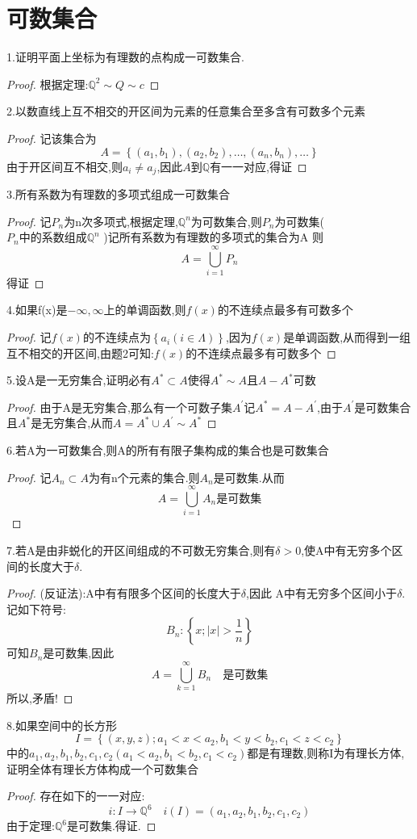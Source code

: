 \section{可数集合}
1.证明平面上坐标为有理数的点构成一可数集合.
\begin{proof}
    根据定理:\(\mathbb{Q}^2 \sim Q \sim c\)
\end{proof}
2.以数直线上互不相交的开区间为元素的任意集合至多含有可数多个元素
\begin{proof}
    记该集合为\[A=\left\{(a_1,b_1),(a_2,b_2),\dots,(a_n,b_n),\dots \right\}\]
    由于开区间互不相交,则\(a_i \neq a_j\),因此\(A\)到\(\mathbb{Q}\)有一一对应,得证
\end{proof}
3.所有系数为有理数的多项式组成一可数集合
\begin{proof}
    记\(P_n\)为n次多项式,根据定理,\(\mathbb{Q}^n\)为可数集合,则\(P_n\)为可数集(\(P_n \text{中的系数组成}\mathbb{Q}^n\) )记所有系数为有理数的多项式的集合为A
    则\[A=\bigcup\limits_{i=1}^{\infty}P_n \]得证
\end{proof}
4.如果f(x)是\(-\infty , \infty \)上的单调函数,则\(f(x)\)的不连续点最多有可数多个
\begin{proof}
    记\(f(x)\)的不连续点为\(\left\{a_i (i \in \Lambda)\right\}\),因为\(f(x)\)是单调函数,从而得到一组互不相交的开区间,由题2可知:\(f(x)\)的不连续点最多有可数多个
\end{proof}
5.设A是一无穷集合,证明必有\(A^{*} \subset A\)使得\(A^{*} \sim A\)且\(A -A^{*}\)可数
\begin{proof}
    由于A是无穷集合,那么有一个可数子集\(A^{'}\)记\(A^{*}=A - A^{'}\),由于\(A^{'}\)是可数集合且\(A^{*}\)是无穷集合,从而\(A=A^{*}\cup A^{'} \sim A^{*}\)
\end{proof}
6.若A为一可数集合,则A的所有有限子集构成的集合也是可数集合
\begin{proof}
    记\(A_n \subset A\)为有n个元素的集合.则\(A_n\)是可数集.从而\[A=\bigcup\limits_{i=1}^{\infty}A_n \text{是可数集}\]
\end{proof}
7.若A是由非蜕化的开区间组成的不可数无穷集合,则有\(\delta >0\),使A中有无穷多个区间的长度大于\(\delta\).
\begin{proof}
    (反证法):A中有有限多个区间的长度大于\(\delta\),因此 A中有无穷多个区间小于\(\delta\). 记如下符号:
    \[B_n :  \left\{x ; |x| > \frac{1}{n} \right\}\]
    可知\(B_n\)是可数集,因此\[A = \bigcup\limits_{k=1}^{\infty} B_n\quad \text{是可数集}\]
    所以,矛盾!
\end{proof}
8.如果空间中的长方形\[I = \left\{(x,y,z) ; a_1 < x<a_2 , b_1<y < b_2,c_1<z<c_2\right\}\]
中的\(a_1,a_2,b_1,b_2,c_1,c_2(a_1< a_2 , b_1 <b_2 ,c_1 <c_2)\)都是有理数,则称I为有理长方体,证明全体有理长方体构成一个可数集合
\begin{proof}
    存在如下的一一对应:\[i: I \rightarrow \mathbb{Q}^6 \quad i(I)=(a_1,a_2,b_1,b_2,c_1,c_2)\]
    由于定理:\(\mathbb{Q}^6\)是可数集.得证.
\end{proof}

